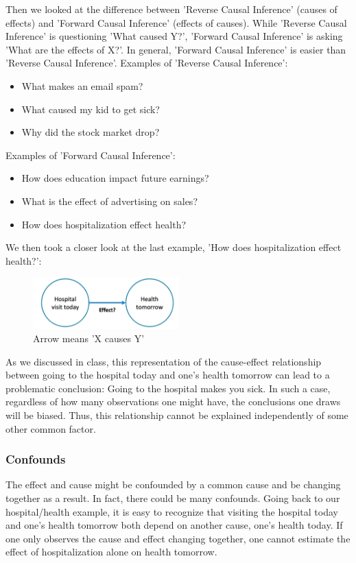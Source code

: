 Then we looked at the difference between 'Reverse Causal Inference' (causes of effects) and 'Forward Causal Inference' (effects of causes). While 'Reverse Causal Inference' is questioning 'What caused Y?', 'Forward Causal Inference' is asking 'What are the effects of X?'. In general, 'Forward Causal Inference' is easier than 'Reverse Causal Inference'. \newline \newline
Examples of 'Reverse Causal Inference':
\begin{itemize}
  \item What makes an email spam?
  \item What caused my kid to get sick?
  \item Why did the stock market drop?
\end{itemize}
Examples of 'Forward Causal Inference':
\begin{itemize}
  \item How does education impact future earnings?
  \item What is the effect of advertising on sales?
  \item How does hospitalization effect health?
\end{itemize}

We then took a closer look at the last example, 'How does hospitalization effect health?':

\begin{figure}[ht]
  \begin{center}
    \includegraphics[width=0.5\textwidth]{figures/hos-health.png}
    \caption{Arrow means 'X causes Y'}
    \label{fig:hos-health}
  \end{center}
\end{figure}

As we discussed in class, this representation of the cause-effect relationship between going to the hospital today and one's health tomorrow can lead to a problematic conclusion: Going to the hospital makes you sick. In such a case, regardless of how many observations one might have, the conclusions one draws will be biased. Thus, this relationship cannot be explained independently of some other common factor.

\subsubsection*{Confounds}
The effect and cause might be confounded by a common cause and be changing together as a result. In fact, there could be many confounds. Going back to our hospital/health example, it is easy to recognize that visiting the hospital today and one's health tomorrow both depend on another cause, one's health today. If one only observes the cause and effect changing together, one cannot estimate the effect of hospitalization alone on health tomorrow.


